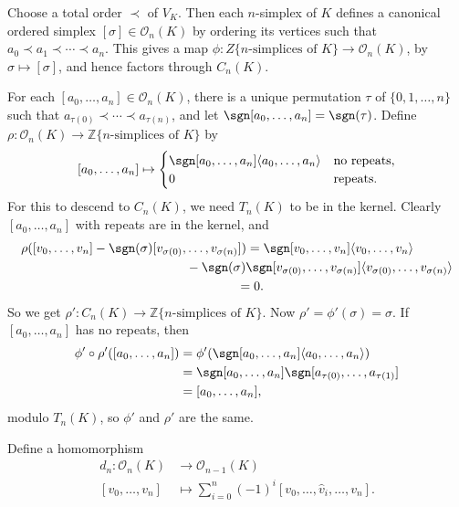 \documentclass[12pt]{article}
\begin{document}
\begin{proofbox}
	Choose a total order $\prec$ of $V_K$. Then each $n$-simplex of $K$ defines a canonical ordered simplex $[\sigma] \in \mathcal{O}_n(K)$ by ordering its vertices such that $a_0 \prec a_1 \prec \cdots \prec a_n$. This gives a map $\phi : Z\{n\text{-simplices of } K\} \to \mathcal{O}_n(K)$, by $\sigma \mapsto [\sigma]$, and hence factors through $C_n(K)$.

	For each $[a_0, \ldots, a_n] \in \mathcal{O}_n(K)$, there is a unique permutation $\tau$ of $\{0, 1, \ldots, n\}$ such that $a_{\tau(0)} \prec \cdots \prec a_{\tau(n)}$, and let $\sgn[a_0, \ldots, a_n] = \sgn(\tau)$. Define $\rho : \mathcal{O}_n(K) \to \mathbb{Z}\{n\text{-simplices of } K\}$ by
	\[
		[a_0, \ldots, a_n] \mapsto
		\begin{cases}
			\sgn[a_0, \ldots, a_n] \langle a_0, \ldots, a_n \rangle & \text{no repeats}, \\
			0 & \text{repeats}.
		\end{cases}
	\]
	For this to descend to $C_n(K)$, we need $T_n(K)$ to be in the kernel. Clearly $[a_0, \ldots, a_n]$ with repeats are in the kernel, and 
	\begin{align*}
		\rho([v_0, \ldots, v_n] - \sgn(\sigma) [v_{\sigma(0)}, &\ldots, v_{\sigma(n)}]) = \sgn[v_0, \ldots, v_n] \langle v_0, \ldots, v_n \rangle \\
											       &- \sgn(\sigma) \sgn[v_{\sigma(0)}, \ldots, v_{\sigma(n)} ] \langle v_{\sigma(0)}, \ldots, v_{\sigma(n)}\rangle \\
											       &\qquad \qquad= 0.
	\end{align*}
	So we get $\rho' : C_n(K) \to \mathbb{Z}\{n\text{-simplices of } K\}$. Now $\rho' = \phi'(\sigma) = \sigma$. If $[a_0, \ldots, a_n]$ has no repeats, then
	\begin{align*}
		\phi' \circ \rho'([a_0, \ldots, a_n]) &= \phi'(\sgn[a_0, \ldots, a_n] \langle a_0, \ldots, a_n\rangle) \\
						      &= \sgn[a_0, \ldots, a_n] \sgn[a_{\tau(0)}, \ldots, a_{\tau(1)}] \\
						      &= [a_0, \ldots, a_n],
	\end{align*}
	modulo $T_n(K)$, so $\phi'$ and $\rho'$ are the same.
\end{proofbox}

Define a homomorphism
\begin{align*}
	d_n : \mathcal{O}_n(K) &\to \mathcal{O}_{n-1}(K) \\
	[v_0, \ldots, v_n] &\mapsto \sum_{i = 0}^n (-1)^i [v_0, \ldots, \hat v_i, \ldots, v_n].
\end{align*}
\end{document}
